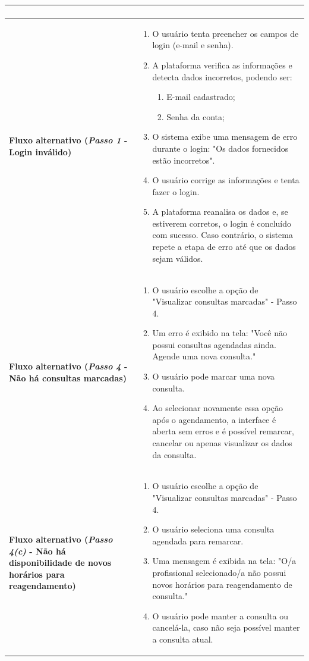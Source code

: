 \documentclass[a4paper,12pt]{report}
\begin{document}
\begin{longtable}{|p{4cm}|p{11.5cm}|}
\begin{enumerate}[leftmargin=*,labelsep=1em]
    \end{enumerate} \\ \hline
    \textbf{Fluxo alternativo (\textit{Passo 1} - Login inválido)} & 
    \begin{enumerate}[leftmargin=*,labelsep=1em]
        \item O usuário tenta preencher os campos de login (e-mail e senha).
        \item A plataforma verifica as informações e detecta dados incorretos, podendo ser:
        \begin{enumerate}
            \item E-mail cadastrado;
            \item Senha da conta;
        \end{enumerate}
        \item O sistema exibe uma mensagem de erro durante o login: "Os dados fornecidos estão incorretos".
        \item O usuário corrige as informações e tenta fazer o login.
        \item A plataforma reanalisa os dados e, se estiverem corretos, o login é concluído com sucesso. Caso contrário, o sistema repete a etapa de erro até que os dados sejam válidos.
    \end{enumerate} \\ \hline
    \textbf{Fluxo alternativo (\textit{Passo 4} - Não há consultas marcadas)} & 
    \begin{enumerate}[leftmargin=*,labelsep=1em]
        \item O usuário escolhe a opção de "Visualizar consultas marcadas" - Passo 4.
        \item Um erro é exibido na tela: "Você não possui consultas agendadas ainda. Agende uma nova consulta."
        \item O usuário pode marcar uma nova consulta.
        \item Ao selecionar novamente essa opção após o agendamento, a interface é aberta sem erros e é possível remarcar, cancelar ou apenas visualizar os dados da consulta.
    \end{enumerate} \\ \hline
    \textbf{Fluxo alternativo (\textit{Passo 4(c)} - Não há disponibilidade de novos horários para reagendamento)} & 
    \begin{enumerate}[leftmargin=*,labelsep=1em]
        \item O usuário escolhe a opção de "Visualizar consultas marcadas" - Passo 4.
        \item O usuário seleciona uma consulta agendada para remarcar.
        \item Uma mensagem é exibida na tela: "O/a profissional selecionado/a não possui novos horários para reagendamento de consulta."
        \item O usuário pode manter a consulta ou cancelá-la, caso não seja possível manter a consulta atual.
    \end{enumerate} \\ \hline
\end{longtable}
\end{document}
